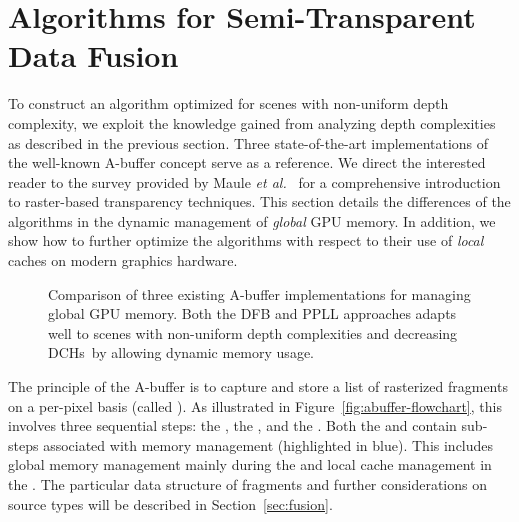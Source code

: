 \documentclass{egpubl}
\def\etal{\emph{et al.}}
\newcommand{\todo}[1]{{\color{red}\emph{(#1)}}}
\newcommand{\ab}{\mbox{A-buffer}}
\newcommand{\dchs}{DCHs}
\begin{document}
\section{Algorithms for Semi-Transparent Data Fusion}
\label{sec:oit-global}

To construct an algorithm optimized for scenes with non-uniform depth complexity, we exploit the knowledge gained from analyzing depth complexities as described in the previous section. 
Three state-of-the-art implementations of the well-known \ab{} concept serve as a reference.
We direct the interested reader to the survey provided by Maule \etal~\cite{Maule2011} for a comprehensive introduction to raster-based transparency techniques.
This section details the differences of the algorithms in the dynamic management of \emph{global} GPU memory.
In addition, we show how to further optimize the algorithms with respect to their use of \emph{local} caches on modern graphics hardware.

\begin{figure}[t]
  \centering
    \def\svgwidth{\textwidth}%
    \graphicspath{{figures/}}%
    {\sffamily\footnotesize}
  \caption{\label{fig:abuffer-global} 
    Comparison of three existing \ab{} implementations for managing global GPU memory. Both the DFB and PPLL approaches adapts well to scenes with non-uniform depth complexities and decreasing \dchs\ by allowing dynamic memory usage. 
  }
\end{figure}



The principle of the \ab{} is to capture and store a list of rasterized fragments on a per-pixel basis (called \emph{\bFraglist}). 
As illustrated in Figure~\ref{fig:abuffer-flowchart}, this involves three sequential steps: the \sClear, the \sFill, and the \sResolve. 
Both the \sFill{} and \sResolve{} contain sub-steps associated with memory management (highlighted in blue). 
This includes global memory management mainly during the \sFill and local cache management in the \sResolve.
The particular data structure of fragments and further considerations on source types will be described in Section~\ref{sec:fusion}.
\end{document}
